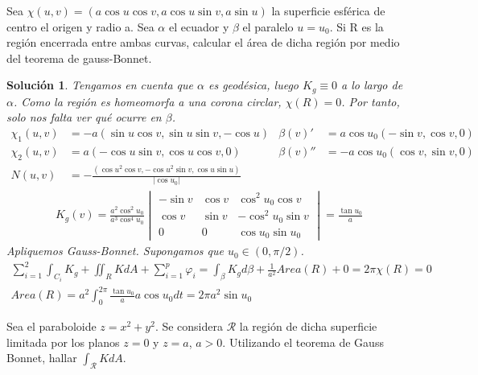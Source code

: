 \documentclass[twoside]{report}
\theoremstyle{plain}
\newtheorem*{sol*}{Solución}
\newcommand{\X}{\chi}
\newenvironment{ejercicio}[2][Estado]{\begin{trivlist}
\item[\hskip \labelsep {\bfseries Ejercicio}\hskip \labelsep {\bfseries #2.}]}{\end{trivlist}}
\begin{document}
\begin{ejercicio}{8} Sea $\X(u,v) = (a\cos{u}\cos{v},a\cos{u}\sin{v},a\sin{u})$ la superficie esférica de centro el origen y radio a. Sea $\alpha$ el ecuador y $\beta$ el paralelo $u=u_0$. Si R es la región encerrada entre ambas curvas, calcular el área de dicha región por medio del teorema de gauss-Bonnet.
\end{ejercicio}
\begin{sol*}
Tengamos en cuenta que $\alpha$ es geodésica, luego $K_g\equiv 0$ a lo largo de $\alpha$. Como la región es homeomorfa a una corona circlar, $\chi(R)=0$. Por tanto, solo nos falta ver qué ocurre en $\beta$. 
\begin{align*}
\X_1(u,v) &= -a(\sin{u}\cos{v},\sin{u}\sin{v},-\cos{u}) &\beta(v)' &=a\cos{u_0}(-\sin{v}, \cos{v},0)\\
\X_2 (u,v)&=  a(-\cos{u}\sin{v}, \cos{u}\cos{v},0) & \beta(v)'' &=-a\cos{u_0}(\cos{v},\sin{v},0)\\
N(u,v)& = -\frac{(\cos{u}^2\cos{v},-\cos{u}^2\sin{v},\cos{u}\sin{u})}{|\cos u_0|}& &
\end{align*}
\begin{gather*}
K_g(v)=\frac{a^2\cos^2 u_0}{a^3\cos^4 u_0}
\begin{vmatrix}
-\sin v & \cos v & \cos^2 u_0 \cos v\\
 \cos v & \sin v & -\cos^2 u_0 \sin v\\
 0 		& 0		 & \cos u_0 \sin u_0
\end{vmatrix}
=
\frac{\tan u_0}{a}
\end{gather*}
Apliquemos Gauss-Bonnet. Supongamos que $u_0 \in (0,\pi/2)$.
\begin{gather*}
\sum_{i=1}^2 \int_{C_i}K_g + \iint_R KdA + \sum_{i=1}^p \varphi_i = \int_\beta K_g d\beta + \frac{1}{a^2}Area(R) + 0 = 2\pi \chi(R)=0\\
Area(R) = a^2 \int_{0}^{2\pi} \frac{\tan u_0}{a} a\cos{u_0} dt = 2\pi a^2 \sin u_0
\end{gather*}
\end{sol*}
\newpage
\begin{ejercicio}{10} Sea el paraboloide $z=x^2+y^2$. Se considera $\mathcal{R}$ la región de dicha superficie limitada por los planos $z=0$ y $z=a$, $a>0$. Utilizando el teorema de Gauss Bonnet, hallar $\int_{\mathcal{R}}KdA$.
\end{ejercicio}
\end{document}
